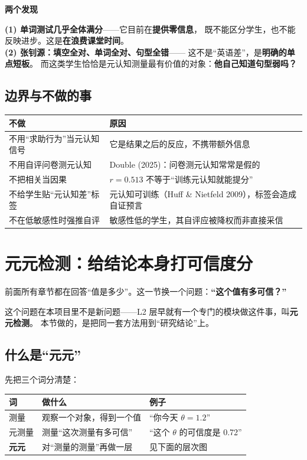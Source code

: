 \documentclass[UTF8,a4paper,11pt]{ctexart}
\newenvironment{explainbox}[1]
{\begin{center}\begin{minipage}{0.94\textwidth}\colorbox{boxbg}{\parbox{0.92\textwidth}{\textbf{#1}\par\vspace{2pt}}}}
{\end{minipage}\end{center}}
\begin{document}
\begin{explainbox}{两个发现}
\textbf{(1) 单词测试几乎全体满分}——它目前在\textbf{提供零信息}，
既不能区分学生，也不能反映进步。这是\textbf{在浪费课堂时间}。\\[4pt]
\textbf{(2) 张钊源：填空全对、单词全对、句型全错}——
这不是“英语差”，是\textbf{明确的单点短板}。
而这类学生恰恰是元认知测量最有价值的对象：\textbf{他自己知道句型弱吗？}
\end{explainbox}

\subsection{边界与不做的事}

\begin{longtable}{@{}p{6.2cm}p{7.4cm}@{}}
\toprule
\textbf{不做} & \textbf{原因} \\
\midrule
不用“求助行为”当元认知信号 & 它是结果之后的反应，不携带额外信息 \\
不用自评问卷测元认知 & Double (2025)：问卷测元认知常常是假的 \\
不把相关当因果 & $r=0.513$ 不等于“训练元认知就能提分” \\
不给学生贴“元认知差”标签 & 元认知可训练（Huff \& Nietfeld 2009），标签会造成自证预言 \\
不在低敏感性时强推自评 & 敏感性低的学生，其自评应被降权而非直接采信 \\
\bottomrule
\end{longtable}

\newpage

\section{元元检测：给结论本身打可信度分}

前面所有章节都在回答“值是多少”。这一节换一个问题：\textbf{“这个值有多可信？”}

这个问题在本项目里不是新问题——L2 层早就有一个专门的模块做这件事，叫\textbf{元元检测}。
本节做的，是把同一套方法用到“研究结论”上。

\subsection{什么是“元元”}

先把三个词分清楚：

\begin{center}
\begin{tabular}{p{2.4cm}p{4.6cm}p{6.6cm}}
\toprule
\textbf{词} & \textbf{做什么} & \textbf{例子} \\
\midrule
测量 & 观察一个对象，得到一个值 & “你今天 $\theta = 1.2$” \\
元测量 & 测量“这次测量有多可信” & “这个 $\theta$ 的可信度是 0.72” \\
\textbf{元元} & 对“测量的测量”再做一层 & 见下面的层次图 \\
\bottomrule
\end{tabular}
\end{center}
\end{document}
